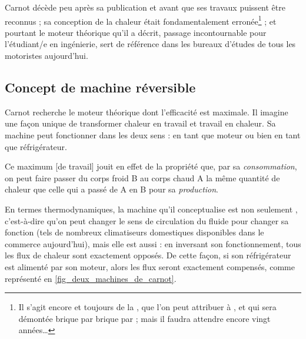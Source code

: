 		 Carnot décède peu après sa publication et avant que ses travaux puissent être reconnus ; sa conception de la chaleur était fondamentalement erronée\footnote{Il s’agit encore et toujours de la , que l’on peut attribuer à , et qui sera démontée brique par brique par  ; mais il faudra attendre encore vingt années…}%
		 ; et pourtant le moteur théorique qu’il a décrit, passage incontournable pour l’étudiant/e en ingénierie, sert de référence dans les bureaux d’études de tous les motoristes aujourd’hui.


	\subsection{Concept de machine réversible}
	\label{ch_concept_machine_reversible}

		Carnot recherche le moteur théorique dont l’efficacité est maximale. Il imagine une façon unique de transformer chaleur en travail et travail en chaleur. Sa machine peut fonctionner dans les deux sens : en tant que moteur ou bien en tant que réfrigérateur.

			Ce maximum [de travail] jouit en effet de la propriété que, par sa \emph{consommation}, on peut faire passer du corps froid B au corps chaud A la même quantité de chaleur que celle qui a passé de A en B pour sa \emph{production}.
		
		En termes thermodynamiques, la machine qu’il conceptualise est non seulement , c’est-à-dire qu’on peut changer le sens de circulation du fluide pour changer sa fonction (tels de nombreux climatiseurs domestiques disponibles dans le commerce aujourd’hui), mais elle est aussi  : en inversant son fonctionnement, tous les flux de chaleur sont exactement opposés. De cette façon, si son réfrigérateur est alimenté par son moteur, alors les flux seront exactement compensés, comme représenté en \cref{fig_deux_machines_de_carnot}.


